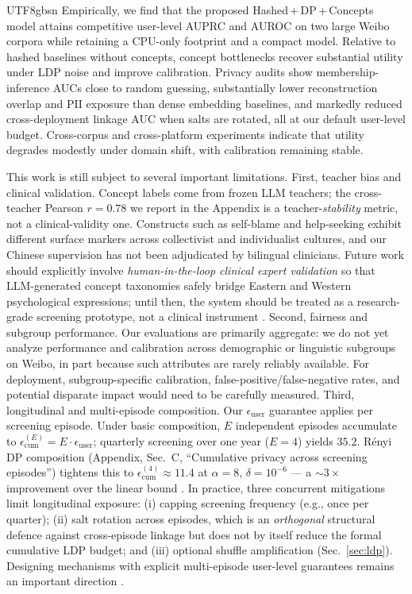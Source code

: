 \documentclass[lettersize,journal]{IEEEtran}
\begin{document}
\begin{CJK*}{UTF8}{gbsn}
Empirically, we find that the proposed Hashed\,+\,DP\,+\,Concepts model attains competitive user-level AUPRC and AUROC on two large Weibo corpora while retaining a CPU-only footprint and a compact model. Relative to hashed baselines without concepts, concept bottlenecks recover substantial utility under LDP noise and improve calibration. Privacy audits show membership-inference AUCs close to random guessing, substantially lower reconstruction overlap and PII exposure than dense embedding baselines, and markedly reduced cross-deployment linkage AUC when salts are rotated, all at our default user-level budget. Cross-corpus and cross-platform experiments indicate that utility degrades modestly under domain shift, with calibration remaining stable.

This work is still subject to several important limitations. First, teacher bias and clinical validation. Concept labels come from frozen LLM teachers; the cross-teacher Pearson $r{=}0.78$ we report in the Appendix is a teacher-\emph{stability} metric, not a clinical-validity one. Constructs such as self-blame and help-seeking exhibit different surface markers across collectivist and individualist cultures, and our Chinese supervision has not been adjudicated by bilingual clinicians. Future work should explicitly involve \emph{human-in-the-loop clinical expert validation} so that LLM-generated concept taxonomies safely bridge Eastern and Western psychological expressions; until then, the system should be treated as a research-grade screening prototype, not a clinical instrument \cite{gilardi2023chatgptannotators,tan2024llmannotationSurvey}.
Second, fairness and subgroup performance. Our evaluations are primarily aggregate: we do not yet analyze performance and calibration across demographic or linguistic subgroups on Weibo, in part because such attributes are rarely reliably available. For deployment, subgroup-specific calibration, false-positive/false-negative rates, and potential disparate impact would need to be carefully measured.
Third, longitudinal and multi-episode composition. Our $\epsilon_{\text{user}}$ guarantee applies per screening episode. Under basic composition, $E$ independent episodes accumulate to $\epsilon_{\text{cum}}^{(E)}{=}E\cdot\epsilon_{\text{user}}$; quarterly screening over one year ($E{=}4$) yields $35.2$. R\'enyi DP composition (Appendix, Sec.~C, ``Cumulative privacy across screening episodes'') tightens this to $\epsilon_{\text{cum}}^{(4)}{\approx}11.4$ at $\alpha{=}8$, $\delta{=}10^{-6}$ --- a $\sim\!3{\times}$ improvement over the linear bound \cite{duchi2013localprivacy,kairouz2015composition}. In practice, three concurrent mitigations limit longitudinal exposure: (i) capping screening frequency (e.g., once per quarter); (ii) salt rotation across episodes, which is an \emph{orthogonal} structural defence against cross-episode linkage but does not by itself reduce the formal cumulative LDP budget; and (iii) optional shuffle amplification (Sec.~\ref{sec:ldp}). Designing mechanisms with explicit multi-episode user-level guarantees remains an important direction \cite{acharya2023userldp}.

\end{CJK*}
\end{document}
